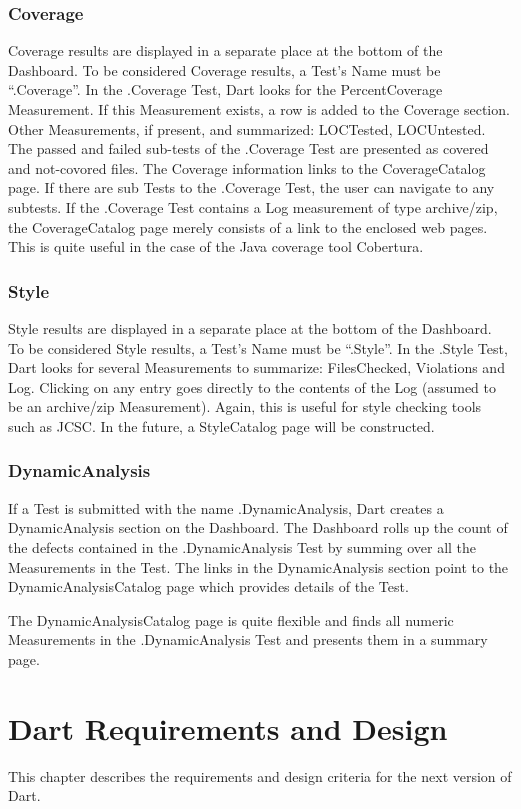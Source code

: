\documentclass{InsightBook}
\begin{document}
\subsection{Coverage}
Coverage results are displayed in a separate place at the bottom of
the Dashboard.  To be considered Coverage results, a Test's Name must
be ``.Coverage''.  In the .Coverage Test, Dart looks for the
PercentCoverage Measurement.  If this Measurement exists, a row is
added to the Coverage section.  Other Measurements, if present, and
summarized: LOCTested, LOCUntested.  The passed and failed sub-tests
of the .Coverage Test are presented as covered and not-covored files.
The Coverage information links to the CoverageCatalog page.  If there
are sub Tests to the .Coverage Test, the user can navigate to any
subtests.  If the .Coverage Test contains a Log measurement of type
archive/zip, the CoverageCatalog page merely consists of a link to the
enclosed web pages.  This is quite useful in the case of the Java
coverage tool Cobertura.

\subsection{Style}
Style results are displayed in a separate place at the bottom of
the Dashboard.  To be considered Style results, a Test's Name must
be ``.Style''.  In the .Style Test, Dart looks for several
Measurements to summarize: FilesChecked, Violations and Log.
Clicking on any entry goes directly to the contents of the Log
(assumed to be an archive/zip Measurement).  Again, this is useful for
style checking tools such as JCSC.  In the future, a StyleCatalog page
will be constructed.

\subsection{DynamicAnalysis}
If a Test is submitted with the name .DynamicAnalysis, Dart creates a
DynamicAnalysis section on the Dashboard.  The Dashboard rolls up the
count of the defects contained in the .DynamicAnalysis Test by summing
over all the Measurements in the Test.  The links in the
DynamicAnalysis section point to the DynamicAnalysisCatalog page which
provides details of the Test.

The DynamicAnalysisCatalog page is quite flexible and finds all
numeric Measurements in the .DynamicAnalysis Test and presents them in
a summary page.

\chapter{Dart Requirements and Design}
This chapter describes the requirements and design criteria for the
next version of Dart.
\end{document}
